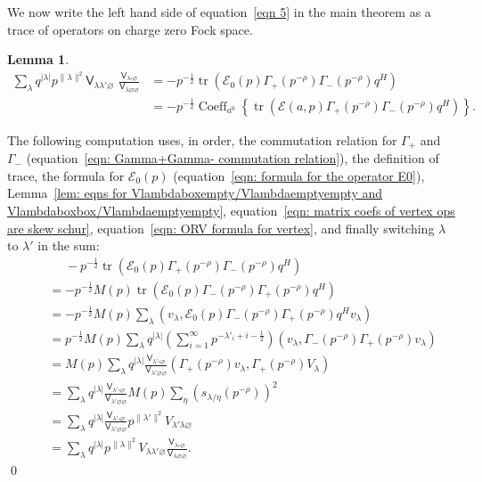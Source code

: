 \documentclass[12pt]{amsart}
\newcommand{\Vsf}{\mathsf{V}}
\newcommand{\bx}{\square}
\renewcommand{\emptyset}{\varnothing}
\newcommand{\half}{\frac{1}{2}}
\newtheorem{lemma}[theorem]{Lemma}
\theoremstyle{definition}
\newcommand{\tr}{\operatorname{tr}}
\newcommand{\E}{\mathcal{E}}
\newcommand{\ptotheminusrho}{p^{-\rho}}
\begin{document}
We now write the left hand side of equation~\eqref{eqn 5} in the main
theorem as a trace of operators on charge zero Fock space.
\begin{lemma}\label{lem: eqn 5 written as a trace}
\begin{align*}
\sum_{\lambda} q^{|\lambda |} p^{\| \lambda \| ^{2}} \Vsf_{\lambda
\lambda' \emptyset}\,\, \frac{\Vsf_{\lambda \bx
\emptyset}}{\Vsf_{\lambda \emptyset \emptyset}}& = -p^{-\half} \tr
\left(\E
_0(p)\Gamma_{+}(\ptotheminusrho )\Gamma_{-}(\ptotheminusrho )q^{H} \right)\\
& =- p^{-\half} \operatorname{Coeff}_{a^{0}}\left\{\tr
\left(\E(a,p)\Gamma_{+}(\ptotheminusrho )\Gamma_{-}(\ptotheminusrho
)q^{H} \right) \right\}.
\end{align*}
\end{lemma}
\proof The following computation uses, in order, the commutation
relation for $\Gamma_{+}$ and $\Gamma_{-}$ (equation~\eqref{eqn:
Gamma+Gamma- commutation relation}), the definition of trace, the
formula for $\E_{0} (p)$ (equation~\eqref{eqn: formula for the
operator E0}), Lemma~\ref{lem: eqns for
Vlambdaboxempty/Vlambdaemptyempty and
Vlambdaboxbox/Vlambdaemptyempty}, equation~\eqref{eqn: matrix coefs of
vertex ops are skew schur}, equation~\eqref{eqn: ORV formula for
vertex}, and finally switching $\lambda$ to $\lambda '$ in the sum:
\begin{align*}
\quad &\,\, \quad - p^{-\half} \tr \left(\E_{0}(p)\Gamma_{+}(\ptotheminusrho )\Gamma_{-}(\ptotheminusrho )q^{H} \right)\\
& =- p^{-\half} M(p) \tr \left(\E_{0}(p)\Gamma_{-}(\ptotheminusrho )\Gamma_{+}(\ptotheminusrho )q^{H} \right)\\
&=-p^{-\half}M(p)\sum_{\lambda} \left(v_{\lambda}, \E_{0}(p)\Gamma_{-}(\ptotheminusrho )\Gamma_{+}(\ptotheminusrho )q^{H} v_{\lambda}\right)\\
&=p^{-\half }M(p) \sum_{\lambda} q^{|\lambda |}
\left(\sum_{i=1}^{\infty}
p^{-\lambda'_{i}+i-\half} \right) \left(v_{\lambda}, \Gamma_{-}(\ptotheminusrho )\Gamma_{+}(\ptotheminusrho )v_{\lambda} \right)\\
&=M(p)\sum_{\lambda}q^{|\lambda |} \frac{\Vsf_{\lambda' \bx
\emptyset}}{\Vsf_{\lambda' \emptyset \emptyset}} \left(\Gamma_{+}(\ptotheminusrho )v_{\lambda },\Gamma_{+}(\ptotheminusrho )V_{\lambda } \right)\\
&= \sum_{\lambda} q^{|\lambda |} \frac{\Vsf_{\lambda' \bx
\emptyset}}{\Vsf_{\lambda' \emptyset \emptyset}} M(p)\sum_{\eta} \left(s_{\lambda /\eta}(\ptotheminusrho ) \right)^{2}\\
&= \sum_{\lambda} q^{|\lambda |} \frac{\Vsf_{\lambda' \bx
\emptyset}}{\Vsf_{\lambda' \emptyset \emptyset}} p^{\| \lambda' \| ^{2}}
V_{\lambda '\lambda \emptyset}\\
&= \sum_{\lambda} q^{|\lambda |}  p^{\| \lambda \| ^{2}}
V_{\lambda \lambda' \emptyset} \frac{\Vsf_{\lambda \bx
\emptyset}}{\Vsf_{\lambda \emptyset \emptyset}}.
\end{align*}
\qed 
\end{document}

